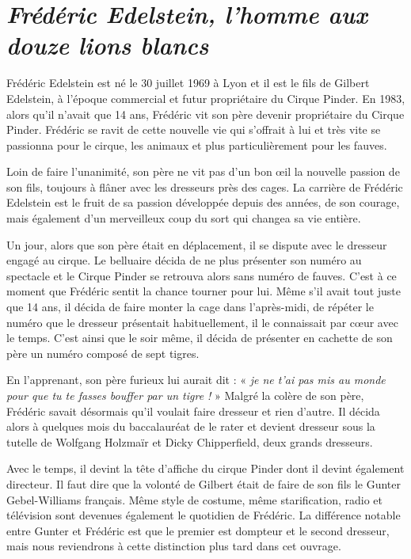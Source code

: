 \section*{\textit{Frédéric Edelstein, l’homme aux douze lions blancs}}
{}

Frédéric Edelstein est né le 30 juillet 1969 à Lyon et il est le fils de Gilbert Edelstein, à l’époque commercial et futur propriétaire du Cirque Pinder. En 1983, alors qu’il n’avait que 14 ans, Frédéric vit son père devenir propriétaire du Cirque Pinder. Frédéric se ravit de cette nouvelle vie qui s’offrait à lui et très vite se passionna pour le cirque, les animaux et plus particulièrement pour les fauves.

Loin de faire l’unanimité, son père ne vit pas d’un bon œil la nouvelle passion de son fils, toujours à flâner avec les dresseurs près des cages. La carrière de Frédéric Edelstein est le fruit de sa passion développée depuis des années, de son courage, mais également d'un merveilleux coup du sort qui changea sa vie entière.

Un jour, alors que son père était en déplacement, il se dispute avec le dresseur engagé au cirque. Le belluaire décida de ne plus présenter son numéro au spectacle et le Cirque Pinder se retrouva alors sans numéro de fauves. C’est à ce moment que Frédéric sentit la chance tourner pour lui. Même s'il avait tout juste que 14 ans, il décida de faire monter la cage dans l’après-midi, de répéter le numéro que le dresseur présentait habituellement, il le connaissait par cœur avec le temps. C’est ainsi que le soir même, il décida de présenter en cachette de son père un numéro composé de sept tigres.

En l’apprenant, son père furieux lui aurait dit : « \textit{je ne t’ai pas mis au monde pour que tu te fasses bouffer par un tigre !} » Malgré la colère de son père, Frédéric savait désormais qu’il voulait faire dresseur et rien d’autre. Il décida alors à quelques mois du baccalauréat de le rater et devient dresseur sous la tutelle de Wolfgang Holzmaïr et Dicky Chipperfield, deux grands dresseurs.

Avec le temps, il devint la tête d’affiche du cirque Pinder dont il devint également directeur. Il faut dire que la volonté de Gilbert était de faire de son fils le Gunter Gebel-Williams français. Même style de costume, même starification, radio et télévision sont devenues également le quotidien de Frédéric. La différence notable entre Gunter et Frédéric est que le premier est dompteur et le second dresseur, mais nous reviendrons à cette distinction plus tard dans cet ouvrage.

